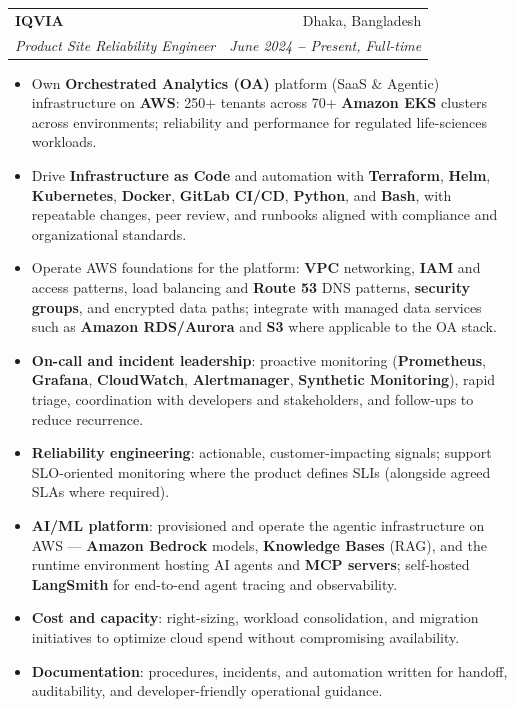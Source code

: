 \documentclass[letterpaper,10.5pt]{article}
\makeatletter
\newcommand{\resumeItem}[1]{
  \item\small{
    {#1 \vspace{-2pt}}
  }
}
\newcommand{\resumeSubheading}[4]{
  \vspace{-2pt}\item
    \begin{tabular*}{0.97\textwidth}[t]{l@{\extracolsep{\fill}}r}
      \textbf{#1} & #2 \\
      \textit{\small#3} & \textit{\small #4} \\
    \end{tabular*}\vspace{-7pt}
}
\newcommand{\resumeItemListStart}{\begin{itemize}}
\newcommand{\resumeItemListEnd}{\end{itemize}\vspace{-5pt}}
\makeatother
\begin{document}
    \resumeSubheading
      {IQVIA}{Dhaka, Bangladesh}
      {Product Site Reliability Engineer}{June 2024 \textbf{--} Present, Full-time}
        \resumeItemListStart
            \resumeItem{Own \textbf{Orchestrated Analytics (OA)} platform (SaaS \& Agentic) infrastructure on \textbf{AWS}: 250+ tenants across 70+ \textbf{Amazon EKS} clusters across environments; reliability and performance for regulated life-sciences workloads.}
            \resumeItem{Drive \textbf{Infrastructure as Code} and automation with \textbf{Terraform}, \textbf{Helm}, \textbf{Kubernetes}, \textbf{Docker}, \textbf{GitLab CI/CD}, \textbf{Python}, and \textbf{Bash}, with repeatable changes, peer review, and runbooks aligned with compliance and organizational standards.}
            \resumeItem{Operate AWS foundations for the platform: \textbf{VPC} networking, \textbf{IAM} and access patterns, load balancing and \textbf{Route 53} DNS patterns, \textbf{security groups}, and encrypted data paths; integrate with managed data services such as \textbf{Amazon RDS/Aurora} and \textbf{S3} where applicable to the OA stack.}
            \resumeItem{\textbf{On-call and incident leadership}: proactive monitoring (\textbf{Prometheus}, \textbf{Grafana}, \textbf{CloudWatch}, \textbf{Alertmanager}, \textbf{Synthetic Monitoring}), rapid triage, coordination with developers and stakeholders, and follow-ups to reduce recurrence.}
            \resumeItem{\textbf{Reliability engineering}: actionable, customer-impacting signals; support SLO-oriented monitoring where the product defines SLIs (alongside agreed SLAs where required).}
            \resumeItem{\textbf{AI/ML platform}: provisioned and operate the agentic infrastructure on AWS — \textbf{Amazon Bedrock} models, \textbf{Knowledge Bases} (RAG), and the runtime environment hosting AI agents and \textbf{MCP servers}; self-hosted \textbf{LangSmith} for end-to-end agent tracing and observability.}
            \resumeItem{\textbf{Cost and capacity}: right-sizing, workload consolidation, and migration initiatives to optimize cloud spend without compromising availability.}
            \resumeItem{\textbf{Documentation}: procedures, incidents, and automation written for handoff, auditability, and developer-friendly operational guidance.}
        \resumeItemListEnd
\end{document}
